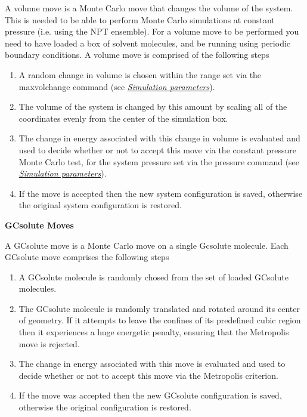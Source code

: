 \documentclass[letterpaper,10pt,english]{manual}
\begin{document}
A volume move is a Monte Carlo move that changes the volume of the system. This is needed to be able to perform Monte Carlo simulations at constant pressure (i.e. using the NPT ensemble). For a volume move to be performed you need to have loaded a box of solvent molecules, and be running using periodic boundary conditions. A volume move is comprised of the following steps
\begin{enumerate}
\item {} 
A random change in volume is chosen within the range set via the maxvolchange command (see \hyperlink{parameters}{\emph{Simulation parameters}}).

\item {} 
The volume of the system is changed by this amount by scaling all of the coordinates evenly from the center of the simulation box.

\item {} 
The change in energy associated with this change in volume is evaluated and used to decide whether or not to accept this move via the constant pressure Monte Carlo test, for the system pressure set via the pressure command (see \hyperlink{parameters}{\emph{Simulation parameters}}).

\item {} 
If the move is accepted then the new system configuration is saved, otherwise the original system configuration is restored.

\end{enumerate}
\textbf{GCsolute Moves}

A GCsolute move is a Monte Carlo move on a single Gcsolute molecule. Each GCsolute move comprises the following steps
\begin{enumerate}
\item {} 
A GCsolute molecule is randomly chosed from the set of loaded GCsolute molecules.

\item {} 
The GCsolute molecule is randomly translated and rotated around its center of geometry. If it attempts to leave the confines of its predefined cubic region then it experiences a huge energetic penalty, ensuring that the Metropolis move is rejected.

\item {} 
The change in energy associated with this move is evaluated and used to decide whether or not to accept this move via the Metropolis criterion.

\item {} 
If the move was accepted then the new GCsolute configuration is saved, otherwise the original configuration is restored.

\end{enumerate}
\end{document}
